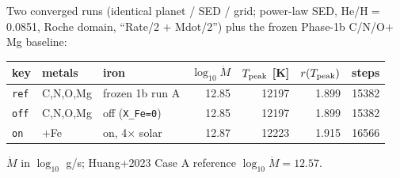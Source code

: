 \documentclass[english,a4paper]{kiseon_memo}
\begin{document}
Two converged runs (identical planet / SED / grid; power-law SED, He/H$=$0.0851,
Roche domain, ``Rate/2 $+$ Mdot/2'') plus the frozen Phase-1b C/N/O$+$Mg baseline:

\begin{center}
\begin{tabular}{lllrrrr}
\hline
key & metals & iron & $\log_{10}\dot M$ & $T_{\rm peak}$ [K] & $r(T_{\rm peak})$ & steps \\
\hline
\texttt{ref} & C,N,O,Mg & frozen 1b run A & 12.85 & 12197 & 1.899 & 15382 \\
\texttt{off} & C,N,O,Mg & off (\verb|X_Fe=0|) & 12.85 & 12197 & 1.899 & 15382 \\
\texttt{on}  & $+$Fe & on, 4$\times$ solar & 12.87 & 12223 & 1.915 & 16566 \\
\hline
\end{tabular}
\end{center}

$\dot M$ in $\log_{10}$ g/s; Huang+2023 Case A reference $\log_{10}\dot M = 12.57$.
\end{document}
